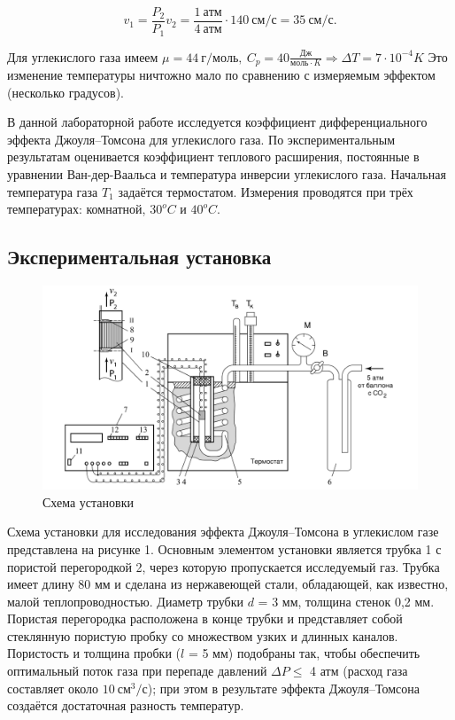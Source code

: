 \documentclass[12pt,a4paper]{article}
\begin{document}
\begin{equation*}
    v_1 = \frac {P_2}{P_1}v_2 = \frac{1\ атм}{4\ атм} \cdot 140\ см/с=35\ см/с.
\end{equation*}

Для углекислого газа имеем $\mu = 44\ г/моль,\ C_p = 40 \frac{Дж}{моль\cdot K} \Rightarrow \Delta T = 7\cdot 10^{-4} K$
Это изменение температуры ничтожно мало по сравнению с измеряемым эффектом (несколько градусов).

В данной лабораторной работе исследуется коэффициент дифференциального эффекта Джоуля–Томсона для углекислого газа. 
По экспериментальным результатам оценивается коэффициент теплового расширения, постоянные в уравнении Ван-дер-Ваальса и температура инверсии углекислого газа. 
Начальная температура газа $T_1$ задаётся термостатом. 
Измерения проводятся при трёх температурах: комнатной, $30^oC$ и $40^oC$.

\subsection*{Экспериментальная установка}
\begin{figure}[htp]
    \centering
    \includegraphics[width=0.7\linewidth]{scheme.png}
    \caption{Схема установки}
\end{figure}
Схема установки для исследования эффекта Джоуля–Томсона в углекислом газе представлена на рисунке 1. 
Основным элементом установки является трубка 1 с пористой перегородкой 2, через которую пропускается исследуемый газ. 
Трубка имеет длину 80 мм и сделана из нержавеющей стали, обладающей, как известно, малой теплопроводностью. 
Диаметр трубки $d$ = 3 мм, толщина стенок 0,2 мм. Пористая перегородка расположена в конце трубки и представляет собой стеклянную пористую пробку со множеством узких и длинных каналов. 
Пористость и толщина пробки ($l$ = 5 мм) подобраны так, чтобы обеспечить оптимальный поток газа при перепаде давлений $\Delta P \le$ 4 атм (расход газа составляет около $10\ см^3/с$); 
при этом в результате эффекта Джоуля–Томсона создаётся достаточная разность температур.
\end{document}
